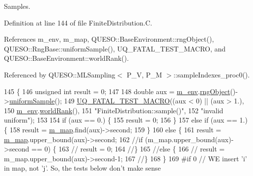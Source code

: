 Samples. 



Definition at line 144 of file Finite\-Distribution.\-C.



References m\-\_\-env, m\-\_\-map, Q\-U\-E\-S\-O\-::\-Base\-Environment\-::rng\-Object(), Q\-U\-E\-S\-O\-::\-Rng\-Base\-::uniform\-Sample(), U\-Q\-\_\-\-F\-A\-T\-A\-L\-\_\-\-T\-E\-S\-T\-\_\-\-M\-A\-C\-R\-O, and Q\-U\-E\-S\-O\-::\-Base\-Environment\-::world\-Rank().



Referenced by Q\-U\-E\-S\-O\-::\-M\-L\-Sampling$<$ P\-\_\-\-V, P\-\_\-\-M $>$\-::sample\-Indexes\-\_\-proc0().


\begin{DoxyCode}
145 \{
146   \textcolor{keywordtype}{unsigned} \textcolor{keywordtype}{int} result = 0;
147 
148   \textcolor{keywordtype}{double} aux = \hyperlink{class_q_u_e_s_o_1_1_finite_distribution_a1e3d075444dbb96d4d31b51a7eafed41}{m\_env}.\hyperlink{class_q_u_e_s_o_1_1_base_environment_afc1f1258b770ac8e27cf308bbcd6a296}{rngObject}()->\hyperlink{class_q_u_e_s_o_1_1_rng_base_aed8342f0c8a4ac0a311cce9cac2b67e5}{uniformSample}();
149   \hyperlink{_defines_8h_a56d63d18d0a6d45757de47fcc06f574d}{UQ\_FATAL\_TEST\_MACRO}((aux < 0) || (aux > 1.),
150                       \hyperlink{class_q_u_e_s_o_1_1_finite_distribution_a1e3d075444dbb96d4d31b51a7eafed41}{m\_env}.\hyperlink{class_q_u_e_s_o_1_1_base_environment_a78b57112bbd0e6dd0e8afec00b40ffa7}{worldRank}(),
151                       \textcolor{stringliteral}{"FiniteDistribution::sample()"},
152                       \textcolor{stringliteral}{"invalid uniform"});
153 
154   \textcolor{keywordflow}{if} (aux == 0.) \{
155     result = 0;
156   \}
157   \textcolor{keywordflow}{else} \textcolor{keywordflow}{if} (aux == 1.) \{
158     result = \hyperlink{class_q_u_e_s_o_1_1_finite_distribution_a7b0ba94a9f10793519056eaf612cbeb1}{m\_map}.find(aux)->second;
159   \}
160   \textcolor{keywordflow}{else} \{
161     result = \hyperlink{class_q_u_e_s_o_1_1_finite_distribution_a7b0ba94a9f10793519056eaf612cbeb1}{m\_map}.upper\_bound(aux)->second;
162     \textcolor{comment}{//if (m\_map.upper\_bound(aux)->second == 0) \{}
163     \textcolor{comment}{//  result = 0;}
164     \textcolor{comment}{//\}}
165     \textcolor{comment}{//else \{}
166     \textcolor{comment}{//  result = m\_map.upper\_bound(aux)->second-1;}
167     \textcolor{comment}{//\}}
168   \}
169 \textcolor{preprocessor}{#if 0 // WE insert 'i' in map, not 'j'. So, the tests below don't make sense}

\end{DoxyCode}
